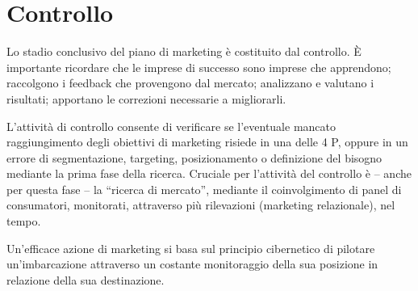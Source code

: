 \chapter{Controllo}
Lo stadio conclusivo del piano di marketing è costituito dal controllo. È importante ricordare che le imprese di successo sono
imprese che apprendono; raccolgono i feedback che provengono dal mercato; analizzano e valutano i risultati; apportano le correzioni necessarie a migliorarli.

L’attività di controllo consente di verificare se l’eventuale mancato raggiungimento degli obiettivi di marketing risiede in una delle 4
P, oppure in un errore di segmentazione, targeting, posizionamento o definizione del bisogno mediante la prima fase della ricerca.
Cruciale per l’attività del controllo è – anche per questa fase – la “ricerca di mercato”, mediante il coinvolgimento
di panel di consumatori, monitorati, attraverso più rilevazioni (marketing relazionale), nel tempo.

Un’efficace azione di marketing si basa sul principio cibernetico di pilotare un’imbarcazione attraverso un costante monitoraggio della sua posizione in relazione della sua destinazione.